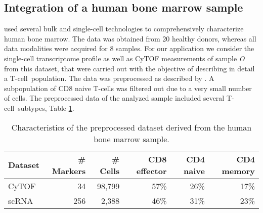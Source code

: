 

\subsection{Integration of a human bone marrow sample}
\citet{oetjen2018} used several bulk and single-cell technologies to comprehensively characterize human bone marrow.
The data was obtained from 20 healthy donors, whereas all data modalities were acquired for 8 samples.
For our application we consider the single-cell transcriptome profile as well as CyTOF measurements of sample \textit{O} from this dataset, that were carried out with the objective of describing in detail a T-cell~population.
The data was preprocessed as described by \citet{oetjen2018}.
A subpopulation of CD8 naive T-cells was filtered out due to a very small number of cells.
The preprocessed data of the analyzed sample included several T-cell~subtypes, Table \ref{tbl:oetjen-dataset}.

\begin{table}[h]
    \centering
    \begin{tabular}{lrrrrr}
    \toprule
    Dataset &  \# Markers &  \# Cells &  CD8 effector &  CD4 naive & CD4 memory  \\
    \midrule
    CyTOF &         34 &   98,799 &       57\% &       26\% & 17\% \\
    scRNA &       256 &     2,388 &       46\% &       31\% & 23\% \\
    \bottomrule
    \end{tabular}
    \caption{
        Characteristics of the preprocessed dataset derived from the human bone marrow sample. 
    }
    \label{tbl:oetjen-dataset}   
\end{table}

